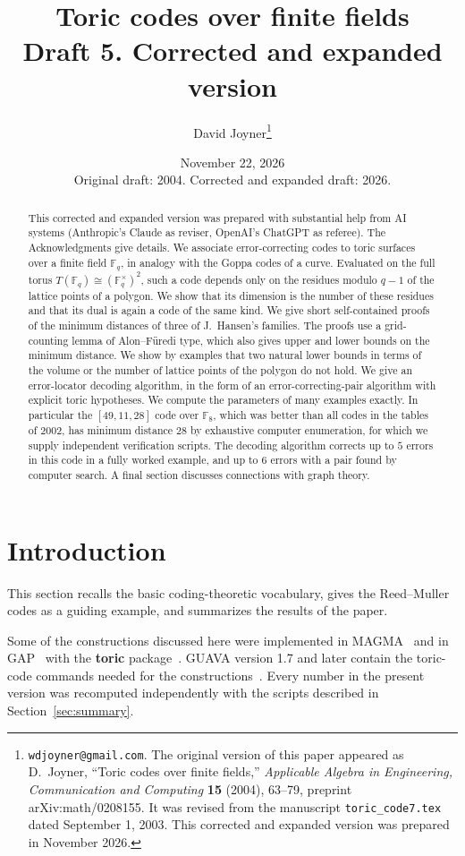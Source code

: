 \documentclass[12pt,letterpaper]{article}
\title{Toric codes over finite fields\\[4pt]
\large Draft 5. Corrected and expanded version}
\author{David Joyner\thanks{\texttt{wdjoyner@gmail.com}.
The original version of this paper appeared as D.~Joyner, ``Toric codes over
finite fields,'' \emph{Applicable Algebra in Engineering, Communication and
Computing} \textbf{15} (2004), 63--79, preprint arXiv:math/0208155. It was
revised from the manuscript \texttt{toric\_code7.tex} dated September 1, 2003.
This corrected and expanded version was prepared in November 2026.}}
\date{November 22, 2026\\
Original draft: 2004. Corrected and expanded draft: 2026.}
\numberwithin{equation}{section}
\theoremstyle{definition}
\theoremstyle{remark}
\newcommand{\F}{\mathbb{F}}
\newcommand{\Fq}{\mathbb{F}_q}
\newcommand{\Fqs}{\mathbb{F}_q^{\times}}
\begin{document}
\maketitle

\begin{abstract}
This corrected and expanded version was prepared with substantial help from AI
systems (Anthropic's Claude as reviser, OpenAI's ChatGPT as referee). The
Acknowledgments give details. We associate error-correcting codes to toric
surfaces over a finite field $\Fq$, in analogy with the Goppa codes of a
curve. Evaluated on the full torus $T(\Fq)\cong(\Fqs)^2$, such a code depends
only on the residues modulo $q-1$ of the lattice points of a polygon. We show
that its dimension is the number of these residues and that its dual is again
a code of the same kind. We give short self-contained proofs of the
minimum distances of three of J.~Hansen's families. The proofs use a
grid-counting lemma of Alon--F\"uredi type, which also gives upper and lower
bounds on the minimum distance. We show by examples that two natural lower
bounds in terms of the volume or the number of lattice points of the polygon
do not hold. We give an error-locator decoding algorithm, in the form of an
error-correcting-pair algorithm with explicit toric hypotheses. We compute the
parameters of many examples exactly. In particular the $[49,11,28]$ code over
$\F_8$, which was better than all codes in the tables of 2002, has minimum
distance $28$ by exhaustive computer enumeration, for which we supply
independent verification scripts. The decoding algorithm corrects up to $5$
errors in this code in a fully worked example, and up to $6$ errors with a
pair found by computer search. A final section discusses connections with
graph theory.
\end{abstract}

\tableofcontents

\section{Introduction}\label{sec:intro}

This section recalls the basic coding-theoretic vocabulary, gives the
Reed--Muller codes as a guiding example, and summarizes the results of the
paper.

Some of the constructions discussed here were implemented in
MAGMA~\cite{BCP97} and in GAP~\cite{GAP00} with the \textbf{toric}
package~\cite{Jo02}. GUAVA version 1.7 and later contain the toric-code
commands needed for the constructions~\cite{GUA02}. Every number in the
present version was recomputed independently with the scripts described in
Section~\ref{sec:summary}.
\end{document}
